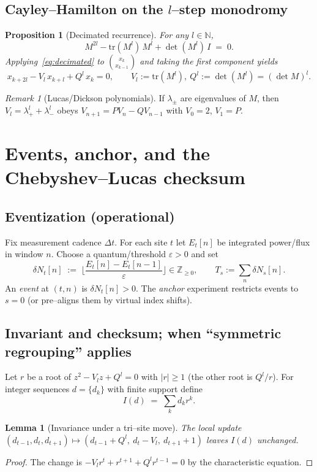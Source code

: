\documentclass[11pt]{article}
\newtheorem{proposition}[theorem]{Proposition}
\newtheorem{lemma}[theorem]{Lemma}
\theoremstyle{definition}
\theoremstyle{remark}
\newtheorem{remark}[theorem]{Remark}
\newcommand{\Z}{\mathbb{Z}}
\newcommand{\N}{\mathbb{N}}
\newcommand{\tr}{\mathrm{tr}}
\begin{document}
\subsection{Cayley--Hamilton on the $l$--step monodromy}
\begin{proposition}[Decimated recurrence]\label{prop:decimated}
For any $l\in\N$,
\begin{equation}\label{eq:decimated}
M^{2l} - \tr(M^l)\,M^l + \det(M^l)\,I \;=\; 0.
\end{equation}
Applying~\eqref{eq:decimated} to $\binom{x_k}{x_{k-1}}$ and taking the first component yields
\begin{equation}\label{eq:trisite}
x_{k+2l}-V_l\,x_{k+l}+Q^l\,x_k=0,\qquad V_l:=\tr(M^l),\ Q^l:=\det(M^l)=(\det M)^l.
\end{equation}
\end{proposition}
\begin{remark}[Lucas/Dickson polynomials]
If $\lambda_\pm$ are eigenvalues of $M$, then $V_l=\lambda_+^l+\lambda_-^l$ obeys $V_{n+1}=P V_n - Q V_{n-1}$ with $V_0=2$, $V_1=P$.
\end{remark}

\section{Events, anchor, and the Chebyshev--Lucas checksum}
\subsection{Eventization (operational)}\label{subsec:eventization}
Fix measurement cadence $\Delta t$. For each site $t$ let $E_t[n]$ be integrated power/flux in window $n$.
Choose a quantum/threshold $\varepsilon>0$ and set
\begin{equation}\label{eq:event}
\delta N_t[n]\;:=\;\Big\lfloor \frac{E_t[n]-E_t[n-1]}{\varepsilon}\Big\rfloor \in \Z_{\ge 0},\qquad
T_s:=\sum_n \delta N_s[n].
\end{equation}
An \emph{event} at $(t,n)$ is $\delta N_t[n]>0$. The \emph{anchor} experiment restricts events to $s=0$ (or pre--aligns them by virtual index shifts).

\subsection{Invariant and checksum; when ``symmetric regrouping'' applies}
Let $r$ be a root of $z^2 - V_l z + Q^l=0$ with $|r|\ge 1$ (the other root is $Q^l/r$).
For integer sequences $d=\{d_k\}$ with finite support define
\begin{equation}
I(d)\;=\;\sum_k d_k r^k.
\end{equation}
\begin{lemma}[Invariance under a tri--site move]\label{lem:invariance}
The local update $(d_{t-1},d_t,d_{t+1})\mapsto (d_{t-1}+Q^l,\ d_t-V_l,\ d_{t+1}+1)$ leaves $I(d)$ unchanged.
\end{lemma}
\begin{proof}
The change is $-V_l r^t + r^{t+1}+Q^l r^{t-1}=0$ by the characteristic equation.
\end{proof}
\end{document}
